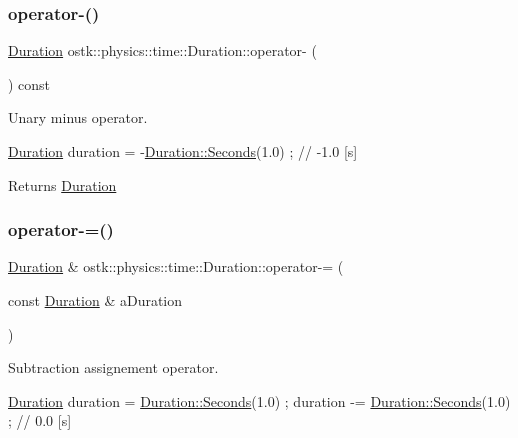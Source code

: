 \subsubsection{\texorpdfstring{operator-\/()}{operator-()}\hspace{0.1cm}{\footnotesize\ttfamily [2/2]}}
{\footnotesize\ttfamily \hyperlink{classostk_1_1physics_1_1time_1_1_duration}{Duration} ostk\+::physics\+::time\+::\+Duration\+::operator-\/ (\begin{DoxyParamCaption}{ }\end{DoxyParamCaption}) const}



Unary minus operator. 


\begin{DoxyCode}
\hyperlink{classostk_1_1physics_1_1time_1_1_duration_a6ba3a020742ca6e3bf0b1970dd039c07}{Duration} duration = -\hyperlink{classostk_1_1physics_1_1time_1_1_duration_ad973fa34fcc308fdcc8d50c3ee694764}{Duration::Seconds}(1.0) ; \textcolor{comment}{// -1.0 [s]}
\end{DoxyCode}


\begin{DoxyReturn}{Returns}
\hyperlink{classostk_1_1physics_1_1time_1_1_duration}{Duration} 
\end{DoxyReturn}
\mbox{\label{classostk_1_1physics_1_1time_1_1_duration_a81655d5bcb4ed4b13d2858a4c01917bd}} 
\subsubsection{\texorpdfstring{operator-\/=()}{operator-=()}}
{\footnotesize\ttfamily \hyperlink{classostk_1_1physics_1_1time_1_1_duration}{Duration} \& ostk\+::physics\+::time\+::\+Duration\+::operator-\/= (\begin{DoxyParamCaption}\item[{const \hyperlink{classostk_1_1physics_1_1time_1_1_duration}{Duration} \&}]{a\+Duration }\end{DoxyParamCaption})}



Subtraction assignement operator. 


\begin{DoxyCode}
\hyperlink{classostk_1_1physics_1_1time_1_1_duration_a6ba3a020742ca6e3bf0b1970dd039c07}{Duration} duration = \hyperlink{classostk_1_1physics_1_1time_1_1_duration_ad973fa34fcc308fdcc8d50c3ee694764}{Duration::Seconds}(1.0) ;
duration -= \hyperlink{classostk_1_1physics_1_1time_1_1_duration_ad973fa34fcc308fdcc8d50c3ee694764}{Duration::Seconds}(1.0) ; \textcolor{comment}{// 0.0 [s]}
\end{DoxyCode}



